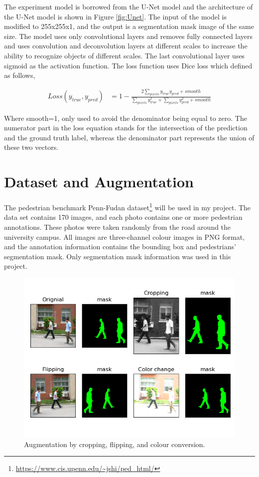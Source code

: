 \documentclass[12pt, a4paper]{article}
\begin{document}
	The experiment model is borrowed from the U-Net model and the architecture of the U-Net model is shown in Figure \ref{fig:Unet}. The input of the model is modified to 255x255x1, and the output is a segmentation mask image of the same size. The model uses only convolutional layers and removes fully connected layers and uses convolution and deconvolution layers at different scales to increase the ability to recognize objects of different scales. The last convolutional layer uses sigmoid as the activation function. The loss function uses Dice loss which defined as follows,
	\begin{normalsize} %
	\begin{align}
	Loss(y_{true}, y_{pred}) &= 1 - \frac{2\sum_{pixels}y_{true}y_{pred} + smooth }{\sum_{pixels}y_{true}^2 + \sum_{pixels}y_{pred}^2 + smooth}
	\end{align}
	\end{normalsize}
	\par
	Where smooth=1, only used to avoid the denominator being equal to zero. The numerator part in the loss equation stands for the intersection of the prediction and the ground truth label, whereas the denominator part represents the union of these two vectors.


	\section{Dataset and Augmentation} \justify
	The pedestrian benchmark Penn-Fudan dataset\footnote{\label{}\url{https://www.cis.upenn.edu/~jshi/ped_html/}} will be used in my project. The data set contains 170 images, and each photo contains one or more pedestrian annotations. These photos were taken randomly from the road around the university campus. All images are three-channel colour images in PNG format, and the annotation information contains the bounding box and pedestrians’ segmentation mask. Only segmentation mask information was used in this project.
	\begin{figure}[h!] %
       \centering
	  \includegraphics[width=0.5\linewidth]{dataset.png}
	  \caption{Augmentation by cropping, flipping, and colour conversion.}
	  \label{fig:augmentation}
	\end{figure}
\end{document}
